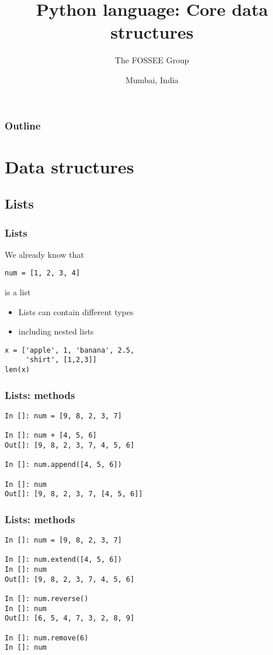 \documentclass[14pt,compress]{beamer}
\title[Data structures]{Python language: Core data structures}
\author[FOSSEE Team] {The FOSSEE Group}
\institute[IIT Bombay] {Department of Aerospace Engineering\\IIT Bombay}
\date[] {Mumbai, India}
\begin{document}
\begin{frame}
  \titlepage
\end{frame}

\begin{frame}
  \frametitle{Outline}
  \tableofcontents
\end{frame}

\section{Data structures}
\subsection{Lists}
\begin{frame}[fragile]
  \frametitle{Lists}
\begin{block}{We already know that}
  \begin{lstlisting}
num = [1, 2, 3, 4]
  \end{lstlisting}
is a list
\end{block}
\pause
\begin{itemize}
\item Lists can contain different types
\item including nested lists
\end{itemize}
\begin{lstlisting}
x = ['apple', 1, 'banana', 2.5,
     'shirt', [1,2,3]]
len(x)
\end{lstlisting}
\end{frame}

\begin{frame}[fragile]
  \frametitle{Lists: methods}
  \begin{lstlisting}
In []: num = [9, 8, 2, 3, 7]

In []: num + [4, 5, 6]
Out[]: [9, 8, 2, 3, 7, 4, 5, 6]

In []: num.append([4, 5, 6])

In []: num
Out[]: [9, 8, 2, 3, 7, [4, 5, 6]]
  \end{lstlisting}
\end{frame}

\begin{frame}[fragile]
  \frametitle{Lists: methods}
  \begin{lstlisting}
In []: num = [9, 8, 2, 3, 7]

In []: num.extend([4, 5, 6])
In []: num
Out[]: [9, 8, 2, 3, 7, 4, 5, 6]

In []: num.reverse()
In []: num
Out[]: [6, 5, 4, 7, 3, 2, 8, 9]

In []: num.remove(6)
In []: num
  \end{lstlisting}
\end{frame}
\end{document}
